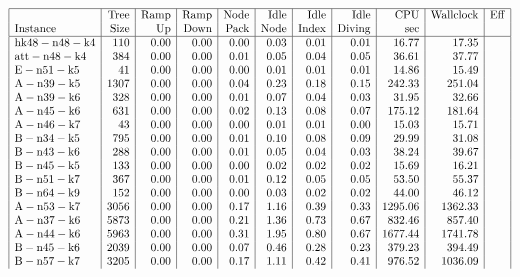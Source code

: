 \documentclass[headrule,landscape]{foils}
\begin{document}
{\tiny
$$
\begin{array}{|l|r|r|r|r|r|r|r|r|r|r|}
\hline
& {\rm Tree}
  & {\rm Ramp}
  & {\rm Ramp}
  & {\rm Node}
  & {\rm Idle}
  & {\rm Idle}
  & {\rm Idle}
  & {\rm CPU} & {\rm Wallclock} 
  & {\rm Eff} \\
{\rm Instance} & {\rm Size}
  & {\rm Up}
  & {\rm Down}
  & {\rm Pack}
  & {\rm Node}
  & {\rm Index}
  & {\rm Diving}
  & {\rm sec} & 
  &  \\
\hline
{\rm hk48-n48-k4} & 110 & 0.00 & 0.00 & 0.00 & 0.03 & 0.01 & 0.01 & 16.77 & 17.35 & \\
{\rm att-n48-k4} & 384 & 0.00 & 0.00 & 0.01 & 0.05 & 0.04 & 0.05 & 36.61 & 37.77 & \\
{\rm E-n51-k5} & 41 & 0.00 & 0.00 & 0.00 & 0.01 & 0.01 & 0.01 & 14.86 & 15.49 & \\
{\rm A-n39-k5} & 1307 & 0.00 & 0.00 & 0.04 & 0.23 & 0.18 & 0.15 & 242.33 & 251.04 & \\
{\rm A-n39-k6} & 328 & 0.00 & 0.00 & 0.01 & 0.07 & 0.04 & 0.03 & 31.95 & 32.66 & \\
{\rm A-n45-k6} & 631 & 0.00 & 0.00 & 0.02 & 0.13 & 0.08 & 0.07 & 175.12 & 181.64 & \\
{\rm A-n46-k7} & 43 & 0.00 & 0.00 & 0.00 & 0.01 & 0.01 & 0.00 & 15.03 & 15.71 & \\
{\rm B-n34-k5} & 795 & 0.00 & 0.00 & 0.01 & 0.10 & 0.08 & 0.09 & 29.99 & 31.08 & \\
{\rm B-n43-k6} & 288 & 0.00 & 0.00 & 0.01 & 0.05 & 0.04 & 0.03 & 38.24 & 39.67 & \\
{\rm B-n45-k5} & 133 & 0.00 & 0.00 & 0.00 & 0.02 & 0.02 & 0.02 & 15.69 & 16.21 & \\
{\rm B-n51-k7} & 367 & 0.00 & 0.00 & 0.01 & 0.12 & 0.05 & 0.05 & 53.50 & 55.37 & \\
{\rm B-n64-k9} & 152 & 0.00 & 0.00 & 0.00 & 0.03 & 0.02 & 0.02 & 44.00 & 46.12 & \\
{\rm A-n53-k7} & 3056 & 0.00 & 0.00 & 0.17 & 1.16 & 0.39 & 0.33 & 1295.06 & 1362.33 & \\
{\rm A-n37-k6} & 5873 & 0.00 & 0.00 & 0.21 & 1.36 & 0.73 & 0.67 & 832.46 & 857.40 & \\
{\rm A-n44-k6} & 5963 & 0.00 & 0.00 & 0.31 & 1.95 & 0.80 & 0.67 & 1677.44 & 1741.78 & \\
{\rm B-n45-k6} & 2039 & 0.00 & 0.00 & 0.07 & 0.46 & 0.28 & 0.23 & 379.23 & 394.49 & \\
{\rm B-n57-k7} & 3205 & 0.00 & 0.00 & 0.17 & 1.11 & 0.42 & 0.41 & 976.52 & 1036.09 & \\

\end{array}$$}
\end{document}

